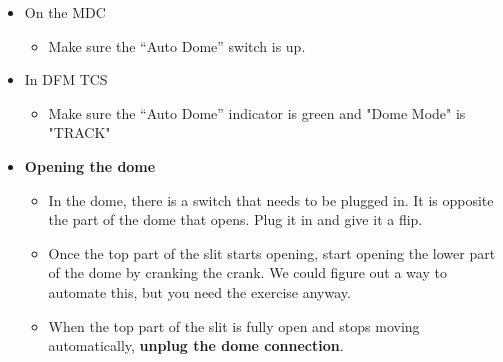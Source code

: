 \documentclass[letterpaper, 12pt]{report}
\begin{document}
\begin{itemize}
\begin{itemize}
\begin{itemize}
\begin{itemize}
						\end{itemize}
					\end{itemize}
					\begin{itemize}
						\item On the MDC
						\begin{itemize}
							\item Make sure the ``Auto Dome'' switch is up.
						\end{itemize}
					\end{itemize}
					\begin{itemize}
						\item In DFM TCS
						\begin{itemize}
							\item Make sure the ``Auto Dome'' indicator is green and "Dome Mode" is "TRACK"
						\end{itemize}
					\end{itemize}
				\end{itemize}
	\end{itemize}
\begin{itemize}
	\item \large \textbf{Opening the dome}
	\begin{itemize}
		\item In the dome, there is a switch that needs to be plugged in. It is opposite the part of the dome that opens. Plug it in and give it a flip.
		\item Once the top part of the slit starts opening, start opening the lower part of the dome by cranking the crank. We could figure out a way to automate this, but you need the exercise anyway.
		\item When the top part of the slit is fully open and stops moving automatically, \textbf{unplug the dome connection}.
	\end{itemize}
\end{itemize}
\end{document}
